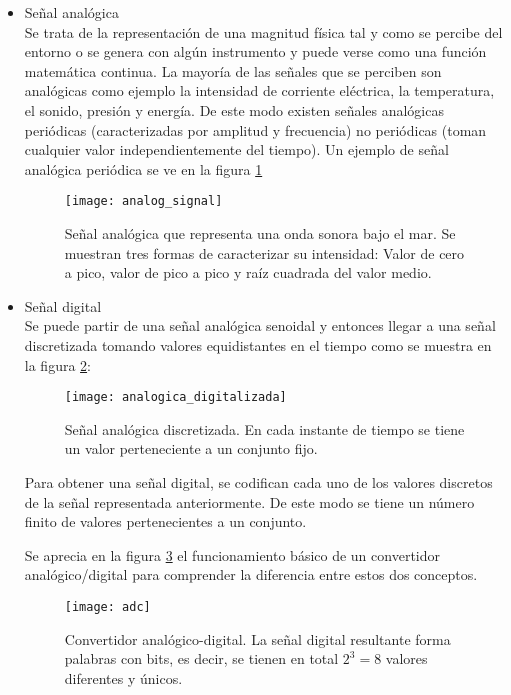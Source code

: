 \begin{itemize}
\item Señal analógica
\\
Se trata de la representación de una magnitud física tal y como se percibe del entorno o se genera con algún instrumento y puede verse como una función matemática continua.
La mayoría de las señales que se perciben son analógicas como ejemplo la intensidad de corriente eléctrica, la temperatura, el sonido, presión y energía.
De este modo existen señales analógicas periódicas (caracterizadas por amplitud y frecuencia) no periódicas (toman cualquier valor independientemente del tiempo). Un ejemplo de señal analógica periódica se ve en la figura \ref{fig:analog_signal}

\begin{figure}[!htb]
\centering
{}
  \texttt{[image: analog\_signal]}
  \caption{Señal analógica que representa una onda sonora bajo el mar. Se muestran tres formas de caracterizar su intensidad: Valor de cero a pico, valor de pico a pico y raíz cuadrada del valor medio.}\label{fig:analog_signal}
  
\endminipage\hfill
\end{figure}

\item Señal digital
\\
Se puede partir de una señal analógica senoidal y entonces llegar a una señal discretizada tomando valores equidistantes en el tiempo como se muestra en la figura \ref{fig:analogica_digitalizada}:
\begin{figure}[!htb]
\centering
{}
  \texttt{[image: analogica\_digitalizada]}
  \caption{Señal analógica discretizada. En cada instante de tiempo se tiene un valor perteneciente a un conjunto fijo.}\label{fig:analogica_digitalizada}
\endminipage\hfill
\end{figure}

Para obtener una señal digital, se codifican cada uno de los valores discretos de la señal representada anteriormente. De este modo se tiene un número finito de valores pertenecientes a un conjunto.

Se aprecia en la figura \ref{fig:adc} el funcionamiento básico de un convertidor analógico/digital para comprender la diferencia entre estos dos conceptos.

\begin{figure}[!htb]
\centering
{}
  \texttt{[image: adc]}
  \caption{Convertidor analógico-digital. La señal digital resultante forma palabras con  bits, es decir, se tienen en total $2^3=8$  valores diferentes y únicos.}\label{fig:adc}
\endminipage\hfill
\end{figure}


\end{itemize}
